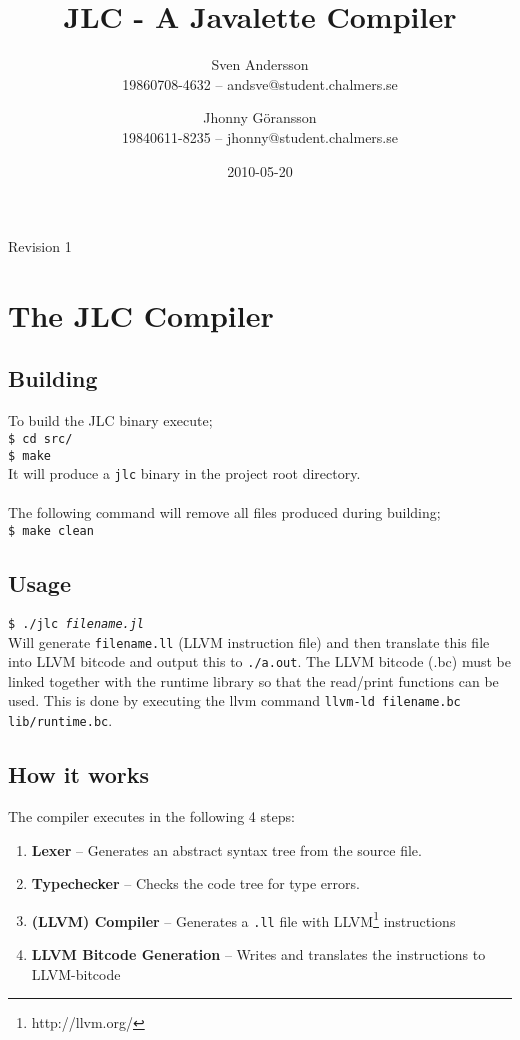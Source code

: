 \documentclass[]{article}
\title{JLC - A Javalette Compiler}
\author{Sven Andersson\\19860708-4632 -- andsve@student.chalmers.se
        \and Jhonny Göransson\\19840611-8235 -- jhonny@student.chalmers.se}
\date{2010-05-20}
\begin{document}
\ifpdf
{}
\else
{}
\fi

\maketitle
\begin{center}
  Revision 1
\end{center}



\section{The JLC Compiler}
  \subsection*{Building}
    To build the JLC binary execute;\\
    \texttt{\$ cd src/}\\
    \texttt{\$ make}\\
    It will produce a \texttt{jlc} binary in the project root directory.\\
    \\
    The following command will remove all files produced during building;\\
    \texttt{\$ make clean}

  \subsection*{Usage}
    \texttt{\$ ./jlc \textit{filename.jl}}\\
    Will generate \texttt{filename.ll} (LLVM instruction file) and then translate this file into LLVM bitcode and output this to \texttt{./a.out}. The LLVM bitcode (.bc) must be linked together with the runtime library so that the read/print functions can be used. This is done by executing the llvm command \texttt{llvm-ld filename.bc lib/runtime.bc}. 
  
  \subsection*{How it works}
    The compiler executes in the following 4 steps:
    \begin{enumerate}
      \item \textbf{Lexer} -- Generates an abstract syntax tree from the source file.
      \item \textbf{Typechecker} -- Checks the code tree for type errors.
      \item \textbf{(LLVM) Compiler} -- Generates a \texttt{.ll} file with LLVM\footnote{http://llvm.org/} instructions
      \item \textbf{LLVM Bitcode Generation} -- Writes and translates the instructions to LLVM-bitcode
    \end{enumerate}
\end{document}
